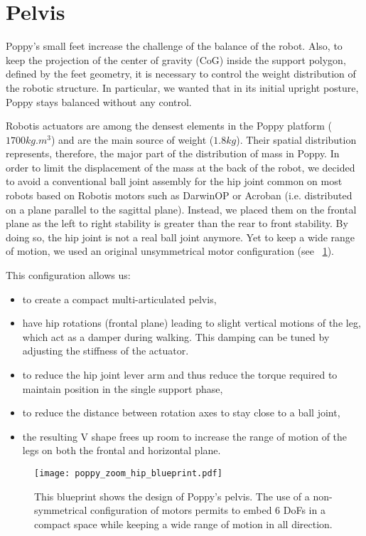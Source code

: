\section{Pelvis} %
\label{sec:hip}


Poppy's small feet increase the challenge of the balance of the robot. Also, to keep the projection of the center of gravity (CoG) inside the support polygon, defined by the feet geometry, it is necessary to control the weight distribution of the robotic structure. In particular, we wanted that in its initial upright posture, Poppy stays balanced without any control.

Robotis actuators are among the densest elements in the Poppy platform ($ 1700 kg.m^{3} $) and are the main source of weight ($1.8 kg$). Their spatial distribution represents, therefore, the major part of the distribution of mass in Poppy. In order to limit the displacement of the mass at the back of the robot, we decided to avoid a conventional ball joint assembly for the hip joint common on most robots based on Robotis motors such as DarwinOP or Acroban (i.e. distributed on a plane parallel to the sagittal plane). Instead, we placed them on the frontal plane as the left to right stability is greater than the rear to front stability. By doing so, the hip joint is not a real ball joint anymore. Yet to keep a wide range of motion, we used an original unsymmetrical motor configuration (see \figurename~\ref{fig:poppy_zoom_hip_blueprint}).

This configuration allows us:

\begin{itemize}
    \item to create a compact multi-articulated pelvis,
    \item have hip rotations (frontal plane) leading to slight vertical motions of the leg, which act as a damper during walking. This damping can be tuned by adjusting the stiffness of the actuator.
    \item to reduce the hip joint lever arm and thus reduce the torque required to maintain position in the single support phase,
    \item to reduce the distance between rotation axes to stay close to a ball joint,
    \item the resulting V shape frees up room to increase the range of motion of the legs on both the frontal and horizontal plane.
\end{itemize}

\begin{figure}[p]
    \begin{center}
        \texttt{[image: poppy\_zoom\_hip\_blueprint.pdf]}
    \end{center}
    \caption{This blueprint shows the design of Poppy's pelvis. The use of a non-symmetrical configuration of motors permits to embed 6 DoFs in a compact space while keeping a wide range of motion in all direction.}
    \label{fig:poppy_zoom_hip_blueprint}
\end{figure}

